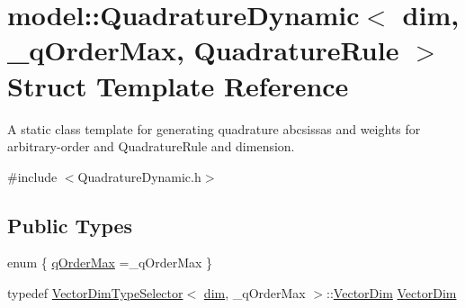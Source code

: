 \hypertarget{structmodel_1_1_quadrature_dynamic}{}\section{model\+:\+:Quadrature\+Dynamic$<$ dim, \+\_\+q\+Order\+Max, Quadrature\+Rule $>$ Struct Template Reference}
\label{structmodel_1_1_quadrature_dynamic}


A static class template for generating quadrature abcsissas and weights for arbitrary-\/order and Quadrature\+Rule and dimension.  




{\ttfamily \#include $<$Quadrature\+Dynamic.\+h$>$}

\subsection*{Public Types}
\begin{DoxyCompactItemize}
\item 
enum \{ \hyperlink{structmodel_1_1_quadrature_dynamic_aaaf0950f2021c9e6d098553f3f95e1b2a3127c89404e35183c741a4eb20176be9}{q\+Order\+Max} =\+\_\+q\+Order\+Max
 \}
\item 
typedef \hyperlink{structmodel_1_1_vector_dim_type_selector}{Vector\+Dim\+Type\+Selector}$<$ \hyperlink{plot_nd_a_8m_a382f3ca768b275b8d563604f7fc7df73}{dim}, \+\_\+q\+Order\+Max $>$\+::\hyperlink{structmodel_1_1_quadrature_dynamic_a938d089d4cea5e1029076fbf5801521a}{Vector\+Dim} \hyperlink{structmodel_1_1_quadrature_dynamic_a938d089d4cea5e1029076fbf5801521a}{Vector\+Dim}
\end{DoxyCompactItemize}
